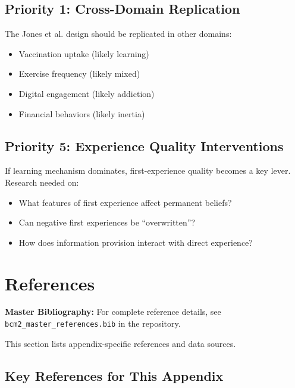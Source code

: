 \subsection{Priority 1: Cross-Domain Replication}

The Jones et al. design should be replicated in other domains:
\begin{itemize}
\item Vaccination uptake (likely learning)
\item Exercise frequency (likely mixed)
\item Digital engagement (likely addiction)
\item Financial behaviors (likely inertia)
\end{itemize}

\subsection{Priority 5: Experience Quality Interventions}

If learning mechanism dominates, first-experience quality becomes a key lever.
Research needed on:
\begin{itemize}
\item What features of first experience affect permanent beliefs?
\item Can negative first experiences be ``overwritten''?
\item How does information provision interact with direct experience?
\end{itemize}


\section{References}
\label{sec:hf-references}

\begin{tcolorbox}[colback=blue!5!white, colframe=blue!75!black]
\textbf{Master Bibliography:} For complete reference details, see
\texttt{bcm2\_master\_references.bib} in the repository.

This section lists appendix-specific references and data sources.
\end{tcolorbox}

\vspace{0.5em}

\subsection{Key References for This Appendix}

